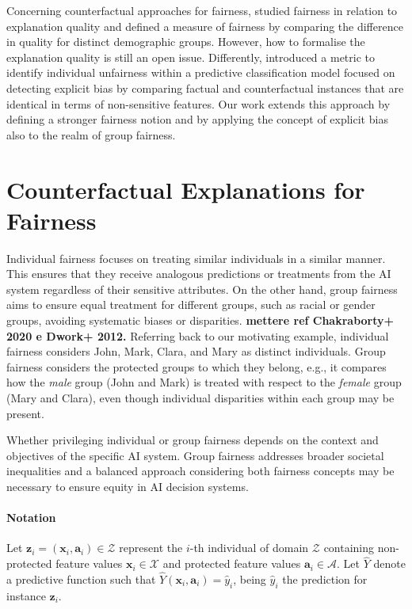 \documentclass[letterpaper]{article} %
\begin{document}
Concerning counterfactual approaches for fairness, \citet{10.1609/aaai.v37i9.26344} studied fairness in relation to explanation quality and defined a measure of fairness by comparing the difference in quality for distinct demographic groups. However, how to formalise the explanation quality is still an open issue.
%
Differently, \citet{goethals2023precof} introduced a metric to identify individual unfairness within a predictive classification model focused on detecting explicit bias by comparing factual and counterfactual instances that are identical in terms of non-sensitive features.
%
Our work extends this approach by defining a stronger fairness notion and by applying the concept of explicit bias also to the realm of group fairness.

\section{Counterfactual Explanations for Fairness}

Individual fairness focuses on treating similar individuals in a similar manner. This ensures that they receive analogous predictions or treatments from the AI system regardless of their sensitive attributes. On the other hand, group fairness aims to ensure equal treatment for different groups, such as racial or gender groups, avoiding systematic biases or disparities. \textbf{mettere ref Chakraborty+ 2020 e Dwork+ 2012.}
%
Referring back to our motivating example, individual fairness considers John, Mark, Clara, and Mary as distinct individuals. Group fairness considers the protected groups to which they belong, e.g., it compares how the \emph{male} group (John and Mark) is treated with respect to the \emph{female} group (Mary and Clara), even though individual disparities within each group may be present.

Whether privileging individual or group fairness depends on the context and objectives of the specific AI system. Group fairness addresses broader societal inequalities and a balanced approach considering both fairness concepts may be necessary to ensure equity in AI decision systems.

\paragraph{Notation}
% 
Let $\boldsymbol{z}_i = (\boldsymbol{x}_i, \boldsymbol{a}_i) \in \mathcal{Z}$ represent the $i$-th individual of domain $\mathcal{Z}$ containing non-protected feature values $\boldsymbol{x}_i \in \mathcal{X}$ and protected feature values $\boldsymbol{a}_i \in \mathcal{A}$.
%
%
Let $\hat{Y}$ denote a predictive function such that $\hat{Y}(\boldsymbol{x}_i, \boldsymbol{a}_i) = \hat{y}_i$, being $\hat{y}_i$ the prediction for instance $\boldsymbol{z}_i$.
\end{document}
